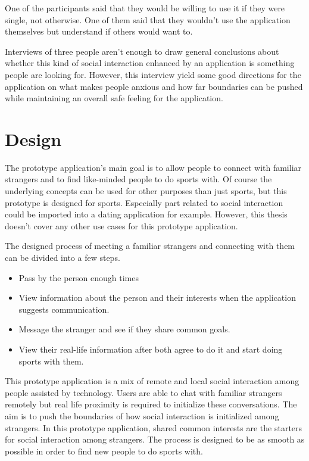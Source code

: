 One of the participants said that they would be willing to use it if they were single, not otherwise. One of them said that they wouldn't use the application themselves but understand if others would want to.

Interviews of three people aren't enough to draw general conclusions about whether this kind of social interaction enhanced by an application is something people are looking for. However, this interview yield some good directions for the application on what makes people anxious and how far boundaries can be pushed while maintaining an overall safe feeling for the application.
\clearpage
\section{Design}

The prototype application's main goal is to allow people to connect with familiar strangers and to find like-minded people to do sports with. Of course the underlying concepts can be used for other purposes than just sports, but this prototype is designed for sports. Especially part related to social interaction could be imported into a dating application for example. However, this thesis doesn't cover any other use cases for this prototype application.

The designed process of meeting a familiar strangers and connecting with them can be divided into a few steps.

\begin{itemize}
	\item Pass by the person enough times
	\item View information about the person and their interests when the application suggests communication.
	\item Message the stranger and see if they share common goals.
	\item View their real-life information after both agree to do it and start doing sports with them.
\end{itemize}

This prototype application is a mix of remote and local social interaction among people assisted by technology. Users are able to chat with familiar strangers remotely but real life proximity is required to initialize these conversations. The aim is to push the boundaries of how social interaction is initialized among strangers. In this prototype application, shared common interests are the starters for social interaction among strangers. The process is designed to be as smooth as possible in order to find new people to do sports with.

